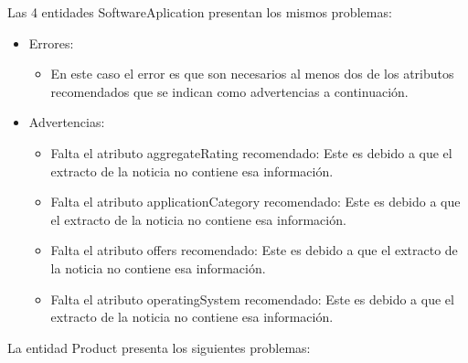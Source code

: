 \documentclass[spanish]{llncs}   %
\begin{document}
Las 4 entidades SoftwareAplication presentan los mismos problemas:

\begin{itemize}
    \item Errores:
    \begin{itemize}
        \item En este caso el error es que son necesarios al menos dos de los atributos recomendados que se indican como advertencias a continuación.
    \end{itemize}
    \item Advertencias:
    \begin{itemize}
        \item Falta el atributo aggregateRating recomendado: Este es debido a que el extracto de la noticia no contiene esa información.
        \item Falta el atributo applicationCategory recomendado: Este es debido a que el extracto de la noticia no contiene esa información.
        \item Falta el atributo offers recomendado: Este es debido a que el extracto de la noticia no contiene esa información.
        \item Falta el atributo operatingSystem recomendado: Este es debido a que el extracto de la noticia no contiene esa información.
    \end{itemize}
\end{itemize}

La entidad Product presenta los siguientes problemas:
\end{document}
